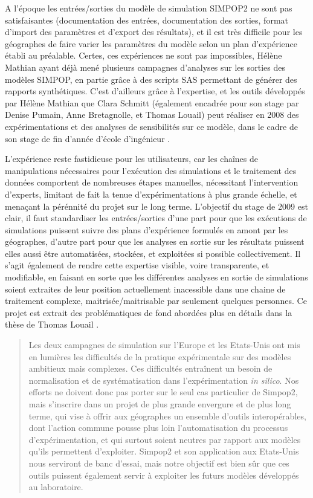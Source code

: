 A l'époque les entrées/sorties du modèle de simulation SIMPOP2 ne sont pas satisfaisantes (documentation des entrées, documentation des sorties, format d'import des paramètres et d'export des résultats), et il est très difficile pour les géographes de faire varier les paramètres du modèle selon un plan d'expérience établi au préalable. Certes, ces expériences ne sont pas impossibles, Hélène Mathian ayant déjà mené plusieurs campagnes d'analyses sur les sorties des modèles SIMPOP, en partie grâce à des scripts SAS permettant de générer des rapports synthétiques. C'est d'ailleurs grâce à l'expertise, et les outils développés par Hélène Mathian que Clara Schmitt (également encadrée pour son stage par Denise Pumain, Anne Bretagnolle, et Thomas Louail) peut réaliser en 2008 des expérimentations et des analyses de sensibilités sur ce modèle, dans le cadre de son stage de fin d'année d'école d'ingénieur \autocite{Schmitt2008}.

L'expérience reste fastidieuse pour les utilisateurs, car les chaînes de manipulations nécessaires pour l'exécution des simulations et le traitement des données comportent de nombreuses étapes manuelles, nécessitant l'intervention d'experts, limitant de fait la tenue d'expérimentations à plus grande échelle, et menaçant la pérénnité du projet sur le long terme. L'objectif du stage de 2009 est clair, il faut standardiser les entrées/sorties d'une part pour que les exécutions de simulations puissent suivre des plans d'expérience formulés en amont par les géographes, d'autre part pour que les analyses en sortie sur les résultats puissent elles aussi être automatisées, stockées, et exploitées si possible collectivement. Il s'agit également de rendre cette expertise visible, voire transparente, et modifiable, en faisant en sorte que les différentes analyses en sortie de simulations soient extraites de leur position actuellement inacessible dans une chaine de traitement complexe, maitrisée/maitrisable par seulement quelques personnes. Ce projet est extrait des problématiques de fond abordées plus en détails dans la thèse de Thomas Louail \autocite[132-145]{Louail2010}.

\blockquote[{\cite[132]{Louail2010}}]{Les deux campagnes de simulation sur l’Europe et les Etats-Unis ont mis en lumières les difficultés de la pratique expérimentale sur des modèles ambitieux mais complexes. Ces difficultés entraînent un besoin de normalisation et de systématisation dans l’expérimentation \textit{in silico}. Nos efforts ne doivent donc pas porter sur le seul cas particulier de Simpop2, mais s’inscrire dans un projet de plus grande envergure et de plus long terme, qui vise à offrir aux géographes un ensemble d’outils interopérables, dont l’action commune pousse plus loin l’automatisation du processus d’expérimentation, et qui surtout soient neutres par rapport aux modèles qu’ils permettent d’exploiter. Simpop2 et son application aux Etats-Unis nous serviront de banc d'essai, mais notre objectif est bien sûr que ces outils puissent également servir à exploiter les futurs modèles développés au laboratoire.}

